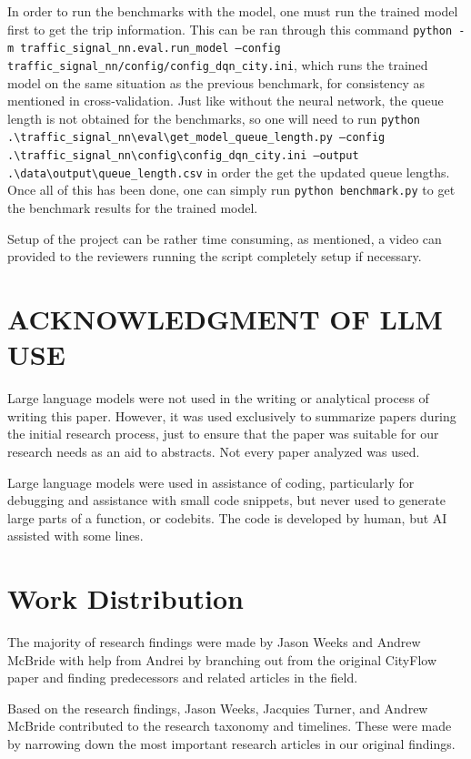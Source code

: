 \documentclass[conference]{IEEEtran}
\begin{document}
In order to run the benchmarks with the model, one must run the trained model first to get the trip information. This can be ran through this command \texttt{python -m traffic\_signal\_nn.eval.run\_model --config traffic\_signal\_nn/config/config\_dqn\_city.ini}, which runs the trained model on the same situation as the previous benchmark, for consistency as mentioned in cross-validation. Just like without the neural network, the queue length is not obtained for the benchmarks, so one will need to run \texttt{python .\textbackslash traffic\_signal\_nn\textbackslash eval\textbackslash get\_model\_queue\_length.py --config .\textbackslash traffic\_signal\_nn\textbackslash config\textbackslash config\_dqn\_city.ini --output .\textbackslash data\textbackslash output\textbackslash queue\_length.csv} in order the get the updated queue lengths. Once all of this has been done, one can simply run \texttt{python benchmark.py} to get the benchmark results for the trained model. 

Setup of the project can be rather time consuming, as mentioned, a video can provided to the reviewers running the script completely setup if necessary. 

\section{ACKNOWLEDGMENT OF LLM USE}

Large language models were not used in the writing or analytical process of writing this paper. However, it was used exclusively to summarize papers during the initial research process, just to ensure that the paper was suitable for our research needs as an aid to abstracts. Not every paper analyzed was used. 

Large language models were used in assistance of coding, particularly for debugging and assistance with small code snippets, but never used to generate large parts of a function, or codebits. The code is developed by human, but AI assisted with some lines. 

\section*{Work Distribution}
The majority of research findings were made by Jason Weeks and Andrew McBride with help from Andrei by branching out from the original CityFlow paper \cite{7} and finding predecessors and related articles in the field. 

Based on the research findings, Jason Weeks, Jacquies Turner, and Andrew McBride contributed to the research taxonomy and timelines. These were made by narrowing down the most important research articles in our original findings.  
\end{document}

